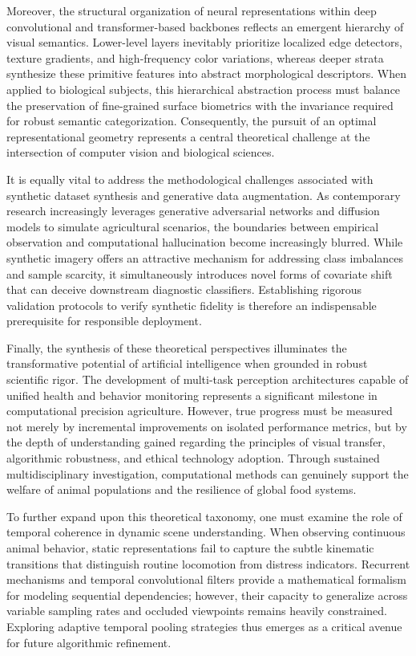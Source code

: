 \documentclass[Times,12pt,oneside,openany,print,index]{report}
\begin{document}
Moreover, the structural organization of neural representations within deep convolutional and transformer-based backbones reflects an emergent hierarchy of visual semantics. Lower-level layers inevitably prioritize localized edge detectors, texture gradients, and high-frequency color variations, whereas deeper strata synthesize these primitive features into abstract morphological descriptors. When applied to biological subjects, this hierarchical abstraction process must balance the preservation of fine-grained surface biometrics with the invariance required for robust semantic categorization. Consequently, the pursuit of an optimal representational geometry represents a central theoretical challenge at the intersection of computer vision and biological sciences.

It is equally vital to address the methodological challenges associated with synthetic dataset synthesis and generative data augmentation. As contemporary research increasingly leverages generative adversarial networks and diffusion models to simulate agricultural scenarios, the boundaries between empirical observation and computational hallucination become increasingly blurred. While synthetic imagery offers an attractive mechanism for addressing class imbalances and sample scarcity, it simultaneously introduces novel forms of covariate shift that can deceive downstream diagnostic classifiers. Establishing rigorous validation protocols to verify synthetic fidelity is therefore an indispensable prerequisite for responsible deployment.

Finally, the synthesis of these theoretical perspectives illuminates the transformative potential of artificial intelligence when grounded in robust scientific rigor. The development of multi-task perception architectures capable of unified health and behavior monitoring represents a significant milestone in computational precision agriculture. However, true progress must be measured not merely by incremental improvements on isolated performance metrics, but by the depth of understanding gained regarding the principles of visual transfer, algorithmic robustness, and ethical technology adoption. Through sustained multidisciplinary investigation, computational methods can genuinely support the welfare of animal populations and the resilience of global food systems.

To further expand upon this theoretical taxonomy, one must examine the role of temporal coherence in dynamic scene understanding. When observing continuous animal behavior, static representations fail to capture the subtle kinematic transitions that distinguish routine locomotion from distress indicators. Recurrent mechanisms and temporal convolutional filters provide a mathematical formalism for modeling sequential dependencies; however, their capacity to generalize across variable sampling rates and occluded viewpoints remains heavily constrained. Exploring adaptive temporal pooling strategies thus emerges as a critical avenue for future algorithmic refinement.
\end{document}

